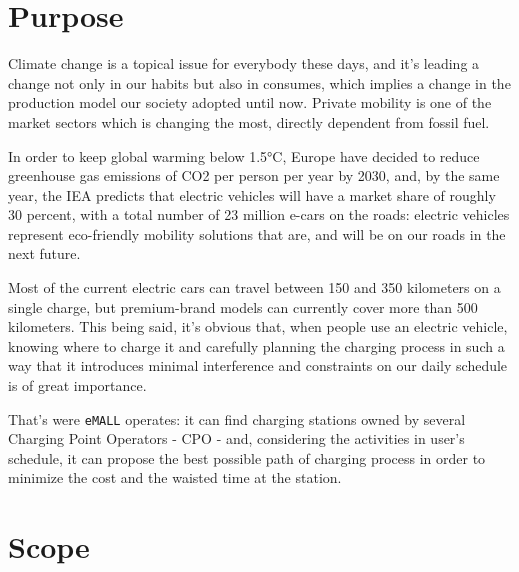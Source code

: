 \section{Purpose}
\label{sec:purpose}%
Climate change is a topical issue for everybody these days, and it's leading a change not only in our habits but also in consumes, which implies a change in the production model our society adopted until now.
Private mobility is one of the market sectors which is changing the most, directly dependent from fossil fuel.

In order to keep global warming below 1.5°C, Europe have decided to reduce greenhouse gas emissions of CO2 per
person per year by 2030, and, by the same year, the IEA predicts that electric vehicles will have a market share of roughly 30 percent, with a total number of 23 million e-cars on the roads: electric vehicles represent eco-friendly mobility solutions that are, and will be on our roads in the next future.

Most of the current electric cars can travel between 150 and 350 kilometers on a single charge, but premium-brand models can currently cover more than 500 kilometers.
This being said, it's obvious that, when people use an electric vehicle, knowing where to charge it and carefully planning the
charging process in such a way that it introduces minimal interference and constraints on our daily schedule
is of great importance.

That's were \verb|eMALL| operates: it can find charging stations owned by several Charging Point Operators - CPO - and,
considering the activities in user's schedule, it can propose the best possible path of charging process
in order to minimize the cost and the waisted time at the station.


\section{Scope}
\label{sec:scope}%


